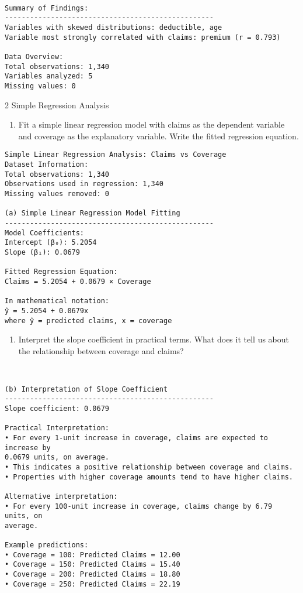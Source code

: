 \documentclass[8pt, twocolumn]{extarticle}
\providecommand{\tightlist}{%
      \setlength{\itemsep}{0pt}\setlength{\parskip}{0pt}}
\begin{document}
    \begin{Verbatim}[commandchars=\\\{\}]

Summary of Findings:
--------------------------------------------------
Variables with skewed distributions: deductible, age
Variable most strongly correlated with claims: premium (r = 0.793)

Data Overview:
Total observations: 1,340
Variables analyzed: 5
Missing values: 0
    \end{Verbatim}

    2 Simple Regression Analysis

    \begin{enumerate}
\def\labelenumi{(\alph{enumi})}
\tightlist
\item
  Fit a simple linear regression model with claims as the dependent
  variable and coverage as the explanatory variable. Write the fitted
  regression equation.
\end{enumerate}

    \begin{Verbatim}[commandchars=\\\{\}]
Simple Linear Regression Analysis: Claims vs Coverage
Dataset Information:
Total observations: 1,340
Observations used in regression: 1,340
Missing values removed: 0

(a) Simple Linear Regression Model Fitting
--------------------------------------------------
Model Coefficients:
Intercept (β₀): 5.2054
Slope (β₁): 0.0679

Fitted Regression Equation:
Claims = 5.2054 + 0.0679 × Coverage

In mathematical notation:
ŷ = 5.2054 + 0.0679x
where ŷ = predicted claims, x = coverage
    \end{Verbatim}

    \begin{enumerate}
\def\labelenumi{(\alph{enumi})}
\setcounter{enumi}{1}
\tightlist
\item
  Interpret the slope coefficient in practical terms. What does it tell
  us about the relationship between coverage and claims?
\end{enumerate}

    \begin{Verbatim}[commandchars=\\\{\}]


(b) Interpretation of Slope Coefficient
--------------------------------------------------
Slope coefficient: 0.0679

Practical Interpretation:
• For every 1-unit increase in coverage, claims are expected to increase by
0.0679 units, on average.
• This indicates a positive relationship between coverage and claims.
• Properties with higher coverage amounts tend to have higher claims.

Alternative interpretation:
• For every 100-unit increase in coverage, claims change by 6.79 units, on
average.

Example predictions:
• Coverage = 100: Predicted Claims = 12.00
• Coverage = 150: Predicted Claims = 15.40
• Coverage = 200: Predicted Claims = 18.80
• Coverage = 250: Predicted Claims = 22.19
    \end{Verbatim}
\end{document}
